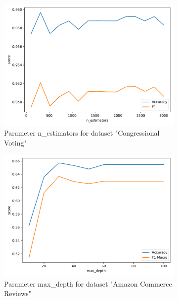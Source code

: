 \documentclass[a4paper,10pt]{article}
\begin{document}
\begin{figure}[h!]
    \captionsetup{justification=centering}
    \begin{subfigure}[b]{0.45\textwidth}
        \includegraphics[width=\textwidth]{congress/plots/RandomForestClassifier_n_estimators_sensitivity.pdf}
        \caption{Parameter \textsf{n\_estimators} for dataset "Congressional Voting"}
    \end{subfigure}
    \hfill
    \begin{subfigure}[b]{0.45\textwidth}
        \includegraphics[width=\textwidth]{amazon/plots/RandomForestClassifier_max_depth_sensitivity.pdf}
        \caption{Parameter \textsf{max\_depth} for dataset "Amazon Commerce Reviews"}
    \end{subfigure}
    \vfill
    \begin{subfigure}[b]{0.45\textwidth}

\end{subfigure}
\end{figure}
\end{document}
